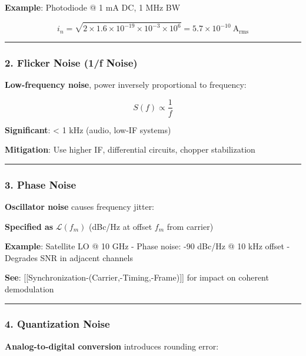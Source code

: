 \textbf{Example}: Photodiode @ 1 mA DC, 1 MHz BW

\[
i_n = \sqrt{2 \times 1.6 \times 10^{-19} \times 10^{-3} \times 10^6} = 5.7 \times 10^{-10}\ \text{A}_{\text{rms}}
\]

\begin{center}\rule{0.5\linewidth}{0.5pt}\end{center}

\subsubsection{2. Flicker Noise (1/f
Noise)}\label{flicker-noise-1f-noise}

\textbf{Low-frequency noise}, power inversely proportional to frequency:

\[
S(f) \propto \frac{1}{f}
\]

\textbf{Significant}: \textless{} 1 kHz (audio, low-IF systems)

\textbf{Mitigation}: Use higher IF, differential circuits, chopper
stabilization

\begin{center}\rule{0.5\linewidth}{0.5pt}\end{center}

\subsubsection{3. Phase Noise}\label{phase-noise}

\textbf{Oscillator noise} causes frequency jitter:

\textbf{Specified as} \(\mathcal{L}(f_m)\) (dBc/Hz at offset \(f_m\)
from carrier)

\textbf{Example}: Satellite LO @ 10 GHz - Phase noise: -90 dBc/Hz @ 10
kHz offset - Degrades SNR in adjacent channels

\textbf{See}: {[}{[}Synchronization-(Carrier,-Timing,-Frame){]}{]} for
impact on coherent demodulation

\begin{center}\rule{0.5\linewidth}{0.5pt}\end{center}

\subsubsection{4. Quantization Noise}\label{quantization-noise}

\textbf{Analog-to-digital conversion} introduces rounding error:

